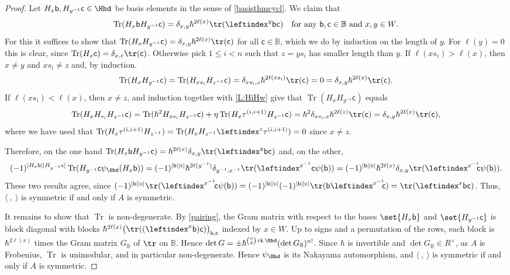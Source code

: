 \documentclass[a4paper,11pt]{amsart}
\let\<\langle
\let\>\rangle
\newcommand{\Tr}{\op{Tr}}
\numberwithin{equation}{subsection}
\theoremstyle{definition}
\theoremstyle{theorem}
\theoremstyle{remark}
\newcommand\Sym{W}
\newcommand\bb{\mathsf{b}}
\newcommand\bc{\mathsf{c}}
\newcommand\op{\operatorname}
\newcommand{\Bo}{\mathbb{B}}
\begin{document}
\begin{proof}
Let $H_x\bb, H_{y^{-1}}\bc\in\Hhd$ be basis elements in the sense of  \autoref{basisthmcycl}. We claim that
\begin{equation}\label{pairing}
\Tr(H_x\bb H_{y^{-1}}\bc)=\delta_{x,y}{\hbar^{2\ell(x)}}\tr(\leftindex^{y}\bb\bc)\quad\text{for any $\bb,\bc\in\Bo$ and $x,y\in\Sym$}.
\end{equation}
  For this it suffices to show that $\Tr(H_xH_{y^{-1}}\bc)=\delta_{x,y}\hbar^{2\ell(x)}\tr(\bc)$ for all $\bc\in\Bo$,
 which we do by induction on the length of $y$. For $\ell(y)=0$ this is clear, since $\Tr(H_x\bc)=\delta_{x,e}\tr(\bc)$.  Otherwise pick $1\leq i<n$ such that $z=ys_i$ has smaller length than $y$.
 If $\ell(xs_i)>\ell(x)$, then $x\not=y$ and $xs_i\not=z$ and,
 by induction.
 \[\Tr(H_xH_{y^{-1}}\bc)=\Tr(H_{xs_i}H_{z^{-1}}\bc)={\delta_{xs_i,z}\hbar^{2\ell(xs_i)}\tr(\bc)=0=\delta_{x,y}\hbar^{2\ell(x)}}\tr(\bc).\]
  If $\ell(xs_i)<\ell(x)$, then $x\not=z$, and induction together with \autoref{L:HiHw} give that $\Tr(H_xH_{y^{-1}}\bc)$ equals
  \[\Tr(H_xH_{s_i}H_{z^{-1}}\bc)=
  \Tr(\hbar^2H_{xs_i}H_{z^{-1}}\bc)+\eta\Tr(H_x\tau^{(i,i+1)}H_{z^{-1}}\bc)=\hbar^2{\delta_{xs_i,z}}\hbar^{2\ell(z)}\tr(\bc)=\delta_{x,y}\hbar^{2\ell(x)}\tr(\bc),\]
  where we have used that
  $\Tr(H_x\tau^{(i,i+1)}H_{z^{-1}})=\Tr(H_xH_{z^{-1}}\leftindex^{z}\tau^{(i,i+1)})=0$
  since $x\neq z$.

  Therefore, on the one hand $\Tr(H_x\bb H_{y^{-1}}\bc)={\hbar^{2\ell(x)}}\delta_{x,y}\tr(\leftindex^{y}\bb\bc)$ and, on the other,
  \[(-1)^{|H_x\bb||H_{y^{-1}}\bc|}\Tr(H_{y^{-1}}\bc
  \psi_{\Hhd}(H_x\bb))=(-1)^{|\bb||\bc|}
   {\hbar^{2\ell(y^{-1})}}\delta_{y^{-1},x^{-1}}\tr(\leftindex^{x^{-1}}\bc\psi(\bb))=(-1)^{|\bb||\bc|}{\hbar^{2\ell(x)}}\delta_{x,y}\tr(\leftindex^{x^{-1}}\!\!\bc\psi(\bb)).\]
  These two results agree, since
  $(-1)^{|\bb||\bc|}\tr(\leftindex^{x^{-1}}\!\bc\psi(\bb))=(-1)^{|\bb||\bc|}(-1)^{|\bb||\bc|}\tr(\bb\leftindex^{x^{-1}}\!\!\bc)=\tr(\leftindex^{x}\bb\bc)$.
  Thus, $ \<\ ,\ \>$ is symmetric if and only if $A$ is symmetric.

 It remains to show that $\Tr$ is non-degenerate.
 By \autoref{pairing}, the Gram matrix with respect to the bases $\set{H_x\bb}$ and
 $\set{H_{y^{-1}}\bc}$ is block diagonal with blocks
 $\hbar^{2\ell(x)}\bigl(\tr((\leftindex^{x}\bb)\bc)\bigr)_{\bb,\bc}$ indexed by $x\in\Sym$. Up
 to signs and a permutation of the rows, each block is
 $\hbar^{2\ell(x)}$ times the Gram matrix $G_\Bo$ of $\tr$ on $\Bo$.
 Hence $\det G=\pm\hbar^{\binom n2\op{rk}\Hhd}(\det G_\Bo)^{n!}$.
 Since $\hbar$ is invertible and $\det G_\Bo\in R^\times$, as $A$ is Frobenius, $\Tr$ is unimodular, and in particular non-degenerate. Hence $\psi_{\Hhd}$ is its Nakayama automorphism, and $\<\ ,\ \>$ is symmetric if and only if $A$ is symmetric.
  \end{proof}
\end{document}

